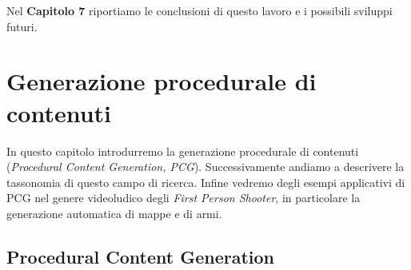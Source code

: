 \documentclass[12pt, italian]{toptesi}
\begin{document}
\bigskip

Nel \textbf{Capitolo 7} riportiamo le conclusioni di questo lavoro e i possibili sviluppi futuri.

\chapter{Generazione procedurale di contenuti}

In questo capitolo introdurremo la generazione procedurale di contenuti (\emph{Procedural Content Generation, PCG}).
Successivamente andiamo a descrivere la tassonomia di questo campo di ricerca.
Infine vedremo degli esempi applicativi di PCG nel genere videoludico degli \emph{First Person Shooter}, in particolare la generazione automatica di mappe e di armi.

\section{Procedural Content Generation}
\end{document}
